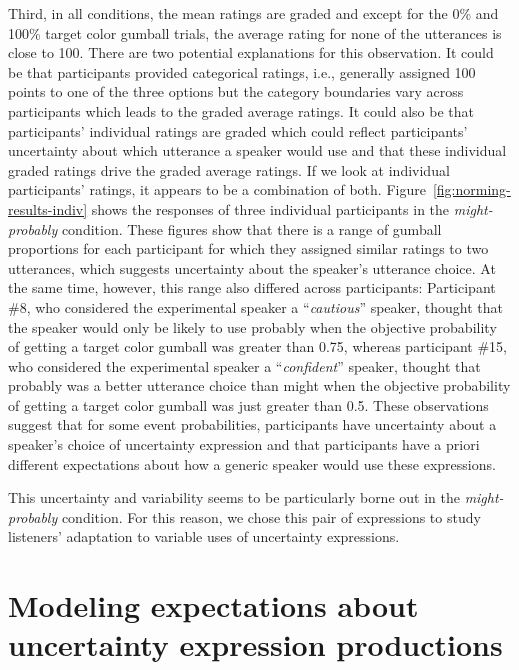 \documentclass[man, floatsintext]{apa6}
\newcommand{\sectionref}[1]{Section~\ref{#1}}
\begin{document}
Third, in all conditions, the mean ratings are graded and except for the 0\% and 100\% target color gumball trials, the average rating for none of the
utterances is close to 100. There are two potential explanations for this observation. It could be that participants provided categorical ratings, i.e.,
generally assigned 100 points to one of the three options but the category boundaries vary across participants which leads to the graded average ratings.
It could also be that participants' individual ratings are graded which could reflect participants' uncertainty about which utterance a speaker would use 
and that these individual graded ratings drive the  graded average ratings. If we look at individual participants' ratings, it appears to be a combination of both.
Figure~\ref{fig:norming-results-indiv} shows the responses of three individual participants in the \emph{might-probably} condition. These figures show that there 
is a range of gumball proportions for each participant for which they assigned similar ratings to two utterances, which suggests uncertainty about the speaker's 
utterance choice. At the same time, however, this range also differed across participants: Participant \#8, who considered the experimental speaker a 
``\textit{cautious}'' speaker, thought that the speaker would only be likely to use {\sc probably} 
when the objective probability of getting a target color gumball was greater than 0.75, whereas participant \#15, who considered the experimental speaker a ``\textit{confident}'' speaker, thought that  {\sc probably} was a better utterance choice than {\sc might} 
when the objective probability of getting a target color gumball was just greater than 0.5. These observations suggest that for some event probabilities, participants have uncertainty  about a 
speaker's choice of uncertainty expression and that participants have a priori different expectations about how a generic speaker would use these expressions.

This uncertainty and variability seems to be particularly borne out in the \emph{might-probably} condition. For this reason, we chose this pair of expressions
to study listeners' adaptation to variable uses of uncertainty expressions.

\section{Modeling expectations about uncertainty expression productions}
\label{sec:model-baseline}

\end{document}
